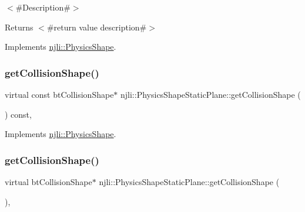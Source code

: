 $<$\#\+Description\#$>$

\begin{DoxyReturn}{Returns}
$<$\#return value description\#$>$ 
\end{DoxyReturn}


Implements \mbox{\hyperlink{classnjli_1_1_physics_shape_a72cb98a55614a3e264b8e4a157b45c64}{njli\+::\+Physics\+Shape}}.

\mbox{\label{classnjli_1_1_physics_shape_static_plane_a59b7263115001da7a90c30b375ac6b80}} 
\subsubsection{\texorpdfstring{get\+Collision\+Shape()}{getCollisionShape()}\hspace{0.1cm}{\footnotesize\ttfamily [1/2]}}
{\footnotesize\ttfamily virtual const bt\+Collision\+Shape$\ast$ njli\+::\+Physics\+Shape\+Static\+Plane\+::get\+Collision\+Shape (\begin{DoxyParamCaption}{ }\end{DoxyParamCaption}) const\hspace{0.3cm}{\ttfamily [protected]}, {\ttfamily [virtual]}}



Implements \mbox{\hyperlink{classnjli_1_1_physics_shape_a527e956caca24bf16ed0d47f69ff14e8}{njli\+::\+Physics\+Shape}}.

\mbox{\label{classnjli_1_1_physics_shape_static_plane_a3a3e5928c3f1a0e944c583025962f418}} 
\subsubsection{\texorpdfstring{get\+Collision\+Shape()}{getCollisionShape()}\hspace{0.1cm}{\footnotesize\ttfamily [2/2]}}
{\footnotesize\ttfamily virtual bt\+Collision\+Shape$\ast$ njli\+::\+Physics\+Shape\+Static\+Plane\+::get\+Collision\+Shape (\begin{DoxyParamCaption}{ }\end{DoxyParamCaption})\hspace{0.3cm}{\ttfamily [protected]}, {\ttfamily [virtual]}}



